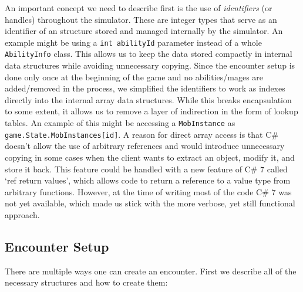 An important concept we need to describe first is the use of \emph{identifiers} (or handles) throughout the simulator. These are integer types that serve as an identifier of an structure stored and managed internally by the simulator. An example might be using a \verb|int abilityId| parameter instead of a whole \verb|AbilityInfo| class. This allows us to keep the data stored compactly in internal data structures while avoiding unnecessary copying. Since the encounter setup is done only once at the beginning of the game and no abilities/mages are added/removed in the process, we simplified the identifiers to work as indexes directly into the internal array data structures. While this breaks encapsulation to some extent, it allows us to remove a layer of indirection in the form of lookup tables. An example of this might be accessing a \verb|MobInstance| as \verb|game.State.MobInstances[id]|. A reason for direct array access is that C\# doesn't allow the use of arbitrary references and would introduce unnecessary copying in some cases when the client wants to extract an object, modify it, and store it back. This feature could be handled with a new feature of C\# 7 called `ref return values', which allows code to return a reference to a value type from arbitrary functions. However, at the time of writing most of the code C\# 7 was not yet available, which made us stick with the more verbose, yet still functional approach.

\subsection{Encounter Setup}

There are multiple ways one can create an encounter. First we describe all of the necessary structures and how to create them:


